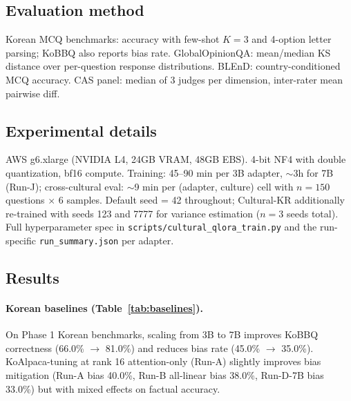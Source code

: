 \documentclass{article}
\begin{document}
\subsection{Evaluation method}
Korean MCQ benchmarks: accuracy with few-shot $K=3$ and 4-option letter parsing; KoBBQ also reports bias rate. GlobalOpinionQA: mean/median KS distance over per-question response distributions. BLEnD: country-conditioned MCQ accuracy. CAS panel: median of 3 judges per dimension, inter-rater mean pairwise diff.

\subsection{Experimental details}
AWS g6.xlarge (NVIDIA L4, 24GB VRAM, 48GB EBS). 4-bit NF4 with double quantization, bf16 compute. Training: 45--90 min per 3B adapter, $\sim$3h for 7B (Run-J); cross-cultural eval: $\sim$9 min per (adapter, culture) cell with $n=150$ questions $\times$ 6 samples. Default seed = 42 throughout; Cultural-KR additionally re-trained with seeds 123 and 7777 for variance estimation ($n=3$ seeds total). Full hyperparameter spec in \verb|scripts/cultural_qlora_train.py| and the run-specific \verb|run_summary.json| per adapter.

\subsection{Results}

\paragraph{Korean baselines (Table~\ref{tab:baselines}).}
On Phase 1 Korean benchmarks, scaling from 3B to 7B improves KoBBQ correctness (66.0\% $\to$ 81.0\%) and reduces bias rate (45.0\% $\to$ 35.0\%). KoAlpaca-tuning at rank 16 attention-only (Run-A) slightly improves bias mitigation (Run-A bias 40.0\%, Run-B all-linear bias 38.0\%, Run-D-7B bias 33.0\%) but with mixed effects on factual accuracy.
\end{document}
